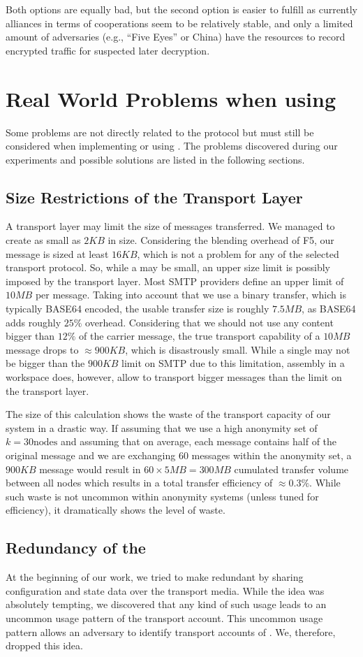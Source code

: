 Both options are equally bad, but the second option is easier to fulfill as currently alliances in terms of cooperations seem to be relatively stable, and only a limited amount of adversaries (e.g., ``Five Eyes'' or China) have the resources to record encrypted traffic for suspected later decryption.

\chapter{Real World Problems when using \MessageVortex}
Some problems are not directly related to the \MessageVortex{} protocol but must still be considered when implementing or using \MessageVortex. The problems discovered during our experiments and possible solutions are listed in the following sections.

\section{Size Restrictions of the Transport Layer}
A transport layer may limit the size of messages transferred. We managed to create \VortexMessages{} as small as $2KB$ in size. Considering the blending overhead of F5, our message is sized at least $16KB$, which is not a problem for any of the selected transport protocol. So, while a \VortexMessage{} may be small, an upper size limit is possibly imposed by the transport layer. Most SMTP providers define an upper limit of $10MB$ per message. Taking into account that we use a binary transfer, which is typically BASE64 encoded, the usable transfer size is roughly $7.5MB$, as BASE64 adds roughly $25\%$ overhead. Considering that we should not use any content bigger than $12\%$ of the carrier message, the true transport capability of a $10MB$ message drops to $\approx 900KB$, which is disastrously small. While a single \VortexMessage may not be bigger than the $900KB$ limit on SMTP due to this limitation, assembly in a workspace does, however, allow to transport bigger messages than the limit on the transport layer.

The size of this calculation shows the waste of the transport capacity of our system in a drastic way. If assuming that we use a high anonymity set of $k=30 \text{nodes}$ and assuming that on average, each message contains half of the original message and we are exchanging 60 messages within the anonymity set, a $900KB$ message would result in $60\times 5MB=300MB$ cumulated transfer volume between all nodes which results in a total transfer efficiency of $\approx 0.3\%$. While such waste is not uncommon within anonymity systems (unless tuned for efficiency), it dramatically shows the level of waste.

\section{Redundancy of the \VortexNode}
At the beginning of our work, we tried to make \VortexNodes{} redundant by sharing configuration and state data over the transport media. While the idea was absolutely tempting, we discovered that any kind of such usage leads to an uncommon usage pattern of the transport account. This uncommon usage pattern allows an adversary to identify transport accounts of \VortexNodes. We, therefore, dropped this idea. 